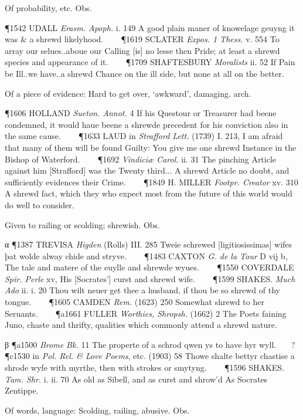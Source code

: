\begin{description}[wide, labelwidth=!, labelindent=0pt]
\begin{myenumerate}
 Of probability, etc. Obs.

\P 1542 UDALL  \textit{Erasm. Apoph.} i. 149 A good plain maner of knowelage geuyng it was \& a shrewd likelyhood.    
\P 1619 SCLATER  \textit{Expos. 1 Thess.} v. 554 To array our selues..aboue our Calling [is] no lesse then Pride; at least a shrewd species and appearance of it.    
\P 1709 SHAFTESBURY  \textit{Moralists} ii. 52 If Pain be Ill..we have..a shrewd Chance on the ill side, but none at all on the better.

 Of a piece of evidence: Hard to get over, ‘awkward’, damaging. arch.

\P 1606 HOLLAND  \textit{Sueton. Annot.} 4 If his Questour or Treasurer had beene condemned, it would haue beene a shrewde precedent for his conviction also in the same cause.    
\P 1633  LAUD in \textit{Strafford Lett.} (1739) I. 213, I am afraid that many of them will be found Guilty: You give me one shrewd Instance in the Bishop of Waterford.    
\P 1692 \textit{Vindiciæ  Carol.} ii. 31 The pinching Article against him [Strafford] was the Twenty third... A shrewd Article no doubt, and sufficiently evidences their Crime.    
\P 1849 H. MILLER  \textit{Footpr. Creator} xv. 310 A shrewd fact, which they who expect most from the future of this world would do well to consider.

 Given to railing or scolding; shrewish. Obs.

α \P 1387 TREVISA  \textit{Higden} (Rolls) III. 285 Tweie schrewed [ligitiosissimas] wifes þat wolde alway chide and stryve.    
\P 1483 CAXTON  \textit{G. de la Tour} D vij b, The tale and matere of the euylle and shrewde wyues.    
\P 1550 COVERDALE  \textit{Spir. Perle} xv, His [Socrates'] curst and shrewd wife.    
\P 1599 SHAKES.  \textit{Much Ado} ii. i. 20 Thou wilt neuer get thee a husband, if thou be so shrewd of thy tongue.    
\P 1605 CAMDEN  \textit{Rem.} (1623) 250 Somewhat shrewd to her Seruants.    
\P a1661 FULLER  \textit{Worthies, Shropsh.} (1662) 2 The Poets faining Juno, chaste and thrifty, qualities which commonly attend a shrewd nature.

β \P a1500 \textit{Brome  Bk.} 11 The properte of a schrod qwen ys to have hyr wyll.    ?
\P c1530 in  \textit{Pol. Rel. \& Love Poems}, etc. (1903) 58 Thowe shalte bettyr chastise a shrode wyfe with myrthe, then with strokes or smytyng.    
\P 1596 SHAKES.  \textit{Tam. Shr.} i. ii. 70 As old as Sibell, and as curst and shrow'd As Socrates Zentippe.

 Of words, language: Scolding, railing, abusive. Obs.


\end{myenumerate}
\end{description}
